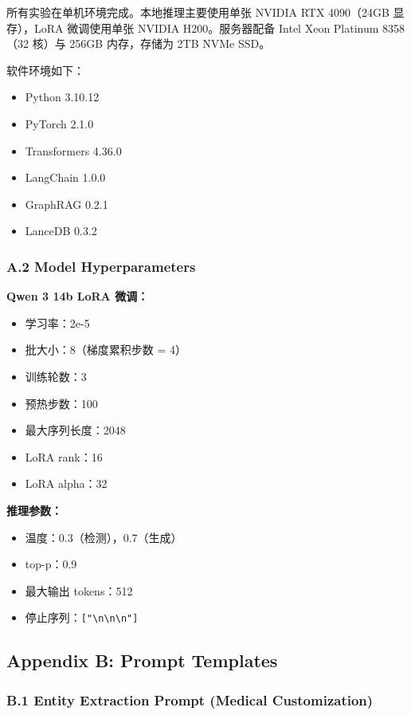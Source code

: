 \documentclass[11pt]{article}
\providecommand{\tightlist}{\setlength{\itemsep}{0pt}\setlength{\parskip}{0pt}}
\begin{document}
所有实验在单机环境完成。本地推理主要使用单张 NVIDIA RTX 4090（24GB 显存），LoRA 微调使用单张 NVIDIA H200。服务器配备 Intel Xeon Platinum 8358（32 核）与 256GB 内存，存储为 2TB NVMe SSD。

软件环境如下：

\begin{itemize}
\tightlist
\item
  Python 3.10.12
\item
  PyTorch 2.1.0
\item
  Transformers 4.36.0
\item
  LangChain 1.0.0
\item
  GraphRAG 0.2.1
\item
  LanceDB 0.3.2
\end{itemize}

\subsubsection{A.2 Model Hyperparameters}

\textbf{Qwen 3 14b LoRA 微调：}

\begin{itemize}
\tightlist
\item
  学习率：2e-5
\item
  批大小：8（梯度累积步数 = 4）
\item
  训练轮数：3
\item
  预热步数：100
\item
  最大序列长度：2048
\item
  LoRA rank：16
\item
  LoRA alpha：32
\end{itemize}

\textbf{推理参数：}

\begin{itemize}
\tightlist
\item
  温度：0.3（检测），0.7（生成）
\item
  top-p：0.9
\item
  最大输出 tokens：512
\item
  停止序列：\texttt{{[}"\textbackslash{}n\textbackslash{}n\textbackslash{}n"{]}}
\end{itemize}

\subsection{Appendix B: Prompt Templates}

\subsubsection{B.1 Entity Extraction Prompt (Medical Customization)}
\end{document}
